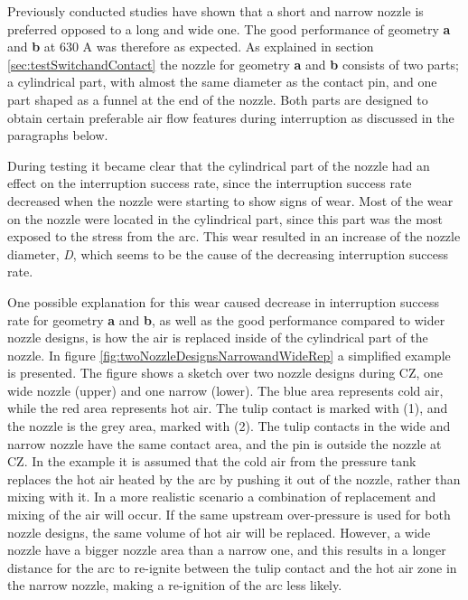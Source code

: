\documentclass[10pt,b5paper,twoside]{article}
\begin{document}
Previously conducted studies have shown that a short and narrow nozzle is preferred opposed to a long and wide one. The good performance of geometry \textbf{a} and \textbf{b} at 630 A was therefore as expected. As explained in section \ref{sec:testSwitchandContact} the nozzle for geometry \textbf{a} and \textbf{b} consists of two parts; a cylindrical part, with almost the same diameter as the contact pin, and one part shaped as a funnel at the end of the nozzle. Both parts are designed to obtain certain preferable air flow features during interruption as discussed in the paragraphs below.

During testing it became clear that the cylindrical part of the nozzle had an effect on the interruption success rate, since the interruption success rate decreased when the nozzle were starting to show signs of wear. Most of the wear on the nozzle were located in the cylindrical part, since this part was the most exposed to the stress from the arc. This wear resulted in an increase of the nozzle diameter, \textit{D}, which seems to be the cause of the decreasing interruption success rate.

One possible explanation for this wear caused decrease in interruption success rate for geometry \textbf{a} and \textbf{b}, as well as the good performance compared to wider nozzle designs, is how the air is replaced inside of the cylindrical part of the nozzle. In figure \ref{fig:twoNozzleDesignsNarrowandWideRep} a simplified example is presented. The figure shows a sketch over two nozzle designs during CZ, one wide nozzle (upper) and one narrow (lower). The blue area represents cold air, while the red area represents hot air. The tulip contact is marked with (1), and the nozzle is the grey area, marked with (2). The tulip contacts in the wide and narrow nozzle have the same contact area, and the pin is outside the nozzle at CZ. In the example it is assumed that the cold air from the pressure tank replaces the hot air heated by the arc by pushing it out of the nozzle, rather than mixing with it. In a more realistic scenario a combination of replacement and mixing of the air will occur. If the same upstream over-pressure is used for both nozzle designs, the same volume of hot air will be replaced. However, a wide nozzle have a bigger nozzle area than a narrow one, and this results in a longer distance for the arc to re-ignite between the tulip contact and the hot air zone in the narrow nozzle, making a re-ignition of the arc less likely.
\end{document}
